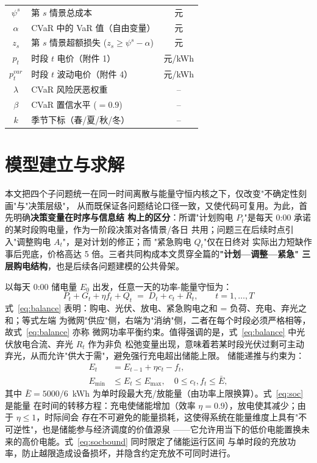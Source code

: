 \documentclass[withoutpreface]{cumcmthesis}
\begin{document}
\begin{footnotesize}
\begin{longtable}{clc}
        $\psi^s$ & 第 $s$ 情景总成本 & 元 \\
        $\alpha$ & CVaR 中的 VaR 值（自由变量） & 元 \\
        $z_s$ & 第 $s$ 情景超额损失 ($z_s\ge\psi^s-\alpha$) & 元 \\
        $p_t$ & 时段 $t$ 电价（附件 1） & 元/kWh \\
        $p_t^{var}$ & 时段 $t$ 波动电价（附件 4） & 元/kWh \\
        $\lambda$ & CVaR 风险厌恶权重 & -- \\
        $\beta$ & CVaR 置信水平 ($=0.9$) & -- \\
        $k$ & 季节下标（春/夏/秋/冬） & -- \\
        \bottomrule[0.8pt]
    \end{longtable}
\end{footnotesize}

\section{模型建立与求解}

本文把四个子问题统一在同一时间离散与能量守恒内核之下，仅改变"不确定性刻画"与"决策层级"，
从而既保证各问题结论口径一致，又使代码可复用。为此，首先明确\textbf{决策变量在时序与信息结
构上的区分}：所谓"计划购电 $P_t$"是每天 0:00 承诺的某时段购电量，作为一阶段决策对各情景/各日
共用；问题三在后续时点引入"调整购电 $A_t$"，是对计划的修正；而 "紧急购电 $Q_t$"仅在日终对
实际出力短缺作事后兜底，价格高达 5 倍。三者共同构成本文贯穿全篇的\textbf{"计划—调整—紧急"
三层购电结构}，也是后续各问题建模的公共骨架。

以每天 0:00 储电量 $E_0$ 出发，任意一天的功率-能量守恒为：
\begin{equation}
    P_t + G_t + \eta f_t + Q_t \;=\; D_t + c_t + R_t,\qquad t=1,\ldots,T
    \label{eq:balance}
\end{equation}
式~\eqref{eq:balance} 表明：购电、光伏、放电、紧急购电之和 = 负荷、充电、弃光之和；等式左端
为微网"供应"侧，右端为"消纳"侧，二者在每个时段必须严格相等，故式~\eqref{eq:balance} 亦称
微网功率平衡约束。值得强调的是，式~\eqref{eq:balance} 中光伏放电合流、弃光 $R_t$ 作为非负
松弛变量出现，意味着若某时段光伏过剩可主动弃光，从而允许"供大于需"，避免强行充电超出储能上限。
储能递推与约束为：
\begin{align}
    E_t &= E_{t-1} + \eta c_t - f_t, \label{eq:soc}\\
    E_{\min} &\le E_t \le E_{\max}, \quad 0\le c_t,f_t \le \bar{E}, \label{eq:socbound}
\end{align}
其中 $\bar{E}=5000/6$~kWh 为单时段最大充/放能量（由功率上限换算）。式~\eqref{eq:soc} 是能量
在时间的转移方程：充电使储能增加（效率 $\eta=0.9$），放电使其减少；由于 $\eta\le1$，时际间会
存在不可避免的能量损耗，这使得系统在能量维度上具有"不可逆性"，也是储能参与经济调度的价值源泉
——它允许用当下的低价电能置换未来的高价电能。式~\eqref{eq:socbound} 同时限定了储能运行区间
与单时段的充放功率，防止越限造成设备损坏，并隐含约定充放不可同时进行。
\end{document}

